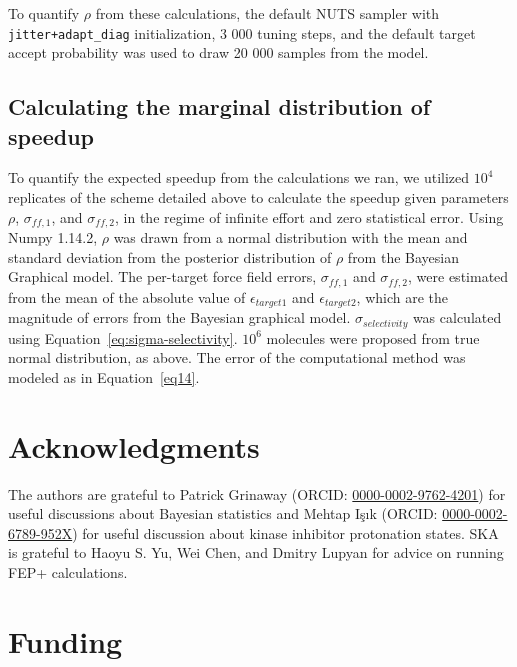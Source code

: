 \documentclass[phd,tocprelim]{cornell}
\begin{document}
To quantify $\rho$ from these calculations, the default NUTS sampler with {\tt jitter+adapt\_diag} initialization, 3 000 tuning steps, and the default target accept probability was used to draw 20 000 samples from the model. 

\subsection{Calculating the marginal distribution of speedup}

To quantify the expected speedup from the calculations we ran, we utilized $10^4$ replicates of the scheme detailed above to calculate the speedup given parameters $\rho$, $\sigma_{ff,1}$, and $\sigma_{ff,2}$, in the regime of infinite effort and zero statistical error. 
Using Numpy 1.14.2, $\rho$ was drawn from a normal distribution with the mean and standard deviation from the posterior distribution of $\rho$ from the Bayesian Graphical model. 
The per-target force field errors, $\sigma_{ff,1}$ and $\sigma_{ff,2}$, were estimated from the mean of the absolute value of  $\epsilon_{target1}$ and $\epsilon_{target2}$, which are the magnitude of errors from the Bayesian graphical model. $\sigma_{selectivity}$ was calculated using Equation~\ref{eq:sigma-selectivity}. 
$10^6$ molecules were proposed from true normal distribution, as above. 
The error of the computational method was modeled as in Equation~\ref{eq14}. 


\section{Acknowledgments}

The authors are grateful to Patrick Grinaway (ORCID: \href{http://orcid.org/0000-0002-9762-4201}{0000-0002-9762-4201}) for useful discussions about Bayesian statistics and Mehtap Işık (ORCID: \href{https://orcid.org/0000-0002-6789-952X}{0000-0002-6789-952X}) for useful discussion about kinase inhibitor protonation states. SKA is grateful to  Haoyu S. Yu, Wei Chen, and Dmitry Lupyan for advice on running FEP+ calculations. 



\section{Funding}
\end{document}
